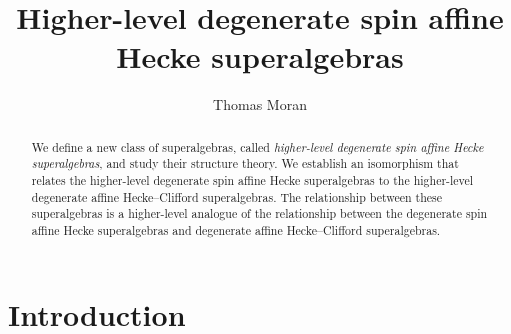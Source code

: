 \documentclass[11pt]{amsart}
\theoremstyle{definition}
\numberwithin{equation}{section}
\begin{document}

\title{Higher-level degenerate spin affine Hecke superalgebras}

\author{Thomas Moran}
\address[T.M.]{
  Department of Mathematics and Statistics \\
  University of Ottawa \\
  Ottawa, ON K1N 6N5, Canada
}

\begin{abstract}
We define a new class of superalgebras, called \emph{higher-level degenerate spin affine Hecke superalgebras}, and study their structure theory. We establish an isomorphism that relates the higher-level degenerate spin affine Hecke superalgebras to the higher-level degenerate affine Hecke--Clifford superalgebras. The relationship between these superalgebras is a higher-level analogue of the relationship between the degenerate spin affine Hecke superalgebras and degenerate affine Hecke--Clifford superalgebras.
\end{abstract}




\maketitle
\thispagestyle{empty}

\tableofcontents


\section{Introduction}
\end{document}
